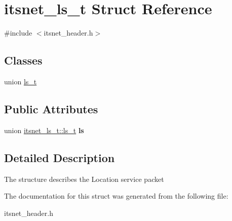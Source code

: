 \hypertarget{structitsnet__ls__t}{\section{itsnet\-\_\-ls\-\_\-t \-Struct \-Reference}
\label{structitsnet__ls__t}
}


{\ttfamily \#include $<$itsnet\-\_\-header.\-h$>$}

\subsection*{\-Classes}
\begin{DoxyCompactItemize}
\item 
union \hyperlink{unionitsnet__ls__t_1_1ls__t}{ls\-\_\-t}
\end{DoxyCompactItemize}
\subsection*{\-Public \-Attributes}
\begin{DoxyCompactItemize}
\item 
\hypertarget{structitsnet__ls__t_a9f11b1d75241ac863ff08a47b5e6d70b}{union \hyperlink{unionitsnet__ls__t_1_1ls__t}{itsnet\-\_\-ls\-\_\-t\-::ls\-\_\-t} {\bfseries ls}}\label{structitsnet__ls__t_a9f11b1d75241ac863ff08a47b5e6d70b}

\end{DoxyCompactItemize}


\subsection{\-Detailed \-Description}
\-The structure describes the \-Location service packet 

\-The documentation for this struct was generated from the following file\-:\begin{DoxyCompactItemize}
\item 
itsnet\-\_\-header.\-h\end{DoxyCompactItemize}
